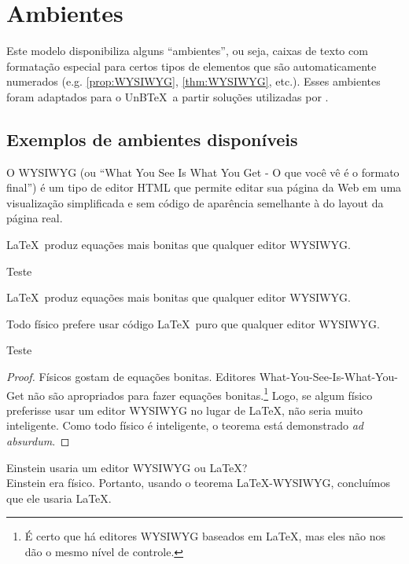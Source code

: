 \chapter{Ambientes}

Este modelo disponibiliza alguns ``ambientes'', ou seja, caixas de texto com formatação especial para certos tipos de elementos que são automaticamente numerados (e.g. \cref{prop:WYSIWYG}, \cref{thm:WYSIWYG}, etc.). Esses ambientes foram adaptados para o UnB\TeX\ a partir soluções utilizadas por .

\section{Exemplos de ambientes disponíveis}

\begin{definition}
O WYSIWYG (ou ``What You See Is What You Get - O que você vê é o formato final'') é um tipo de editor HTML que permite editar sua página da Web em uma visualização simplificada e sem código de aparência semelhante à do layout da página real.
\end{definition}

\begin{proposition}\label{prop:WYSIWYG}
    \LaTeX\ produz equações mais bonitas que qualquer editor WYSIWYG.
\end{proposition}

\begin{lemma}
    Teste
\end{lemma}

\begin{remark}
    \LaTeX\ produz equações mais bonitas que qualquer editor WYSIWYG.
\end{remark}

\begin{theorem}\label{thm:WYSIWYG}
    Todo físico prefere usar código \LaTeX\ puro que qualquer editor WYSIWYG.
\end{theorem}

\begin{corollary}
    Teste
\end{corollary}

\begin{proof}
    Físicos gostam de equações bonitas. Editores What-You-See-Is-What-You-Get não são apropriados para fazer equações bonitas.\footnote{É certo que há editores WYSIWYG baseados em \LaTeX, mas eles não nos dão o mesmo nível de controle.} Logo, se algum físico preferisse usar um editor WYSIWYG no lugar de \LaTeX, não seria muito inteligente. Como todo físico é inteligente, o teorema está demonstrado \textit{ad absurdum}.
\end{proof}

\begin{example}
    Einstein usaria um editor WYSIWYG ou \LaTeX? \\
    Einstein era físico. Portanto, usando o teorema LaTeX-WYSIWYG, concluímos que ele usaria \LaTeX.
\end{example}